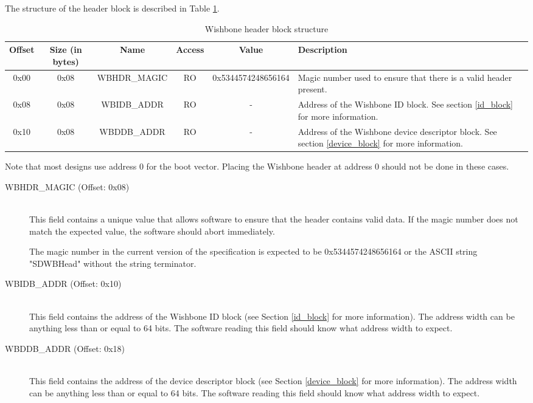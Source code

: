 \documentclass{article}
\begin{document}
The structure of the header block is described in Table \ref{hdr_block_struct}.

\begin{center}
	\begin{savenotes}
	\begin{table}[!ht]\footnotesize
	\caption{Wishbone header block structure}\label{hdr_block_struct}\centering
	\begin{tabular}{| c | c | c | c | c | p{5cm} |} \hline
	Offset & Size (in bytes) & Name & Access & Value & Description \\ \hline
	0x00 & 0x08 & WBHDR\_MAGIC & RO & 0x5344574248656164 & Magic number used to ensure that there is a valid header present. \\ \hline
	0x08 & 0x08 & WBIDB\_ADDR & RO & - & Address of the Wishbone ID block. See section \ref{id_block} for more information. \\ \hline
	0x10 & 0x08 & WBDDB\_ADDR & RO & - & Address of the Wishbone device descriptor block. See section \ref{device_block} for more information. \\ \hline
	\end{tabular}
	\end{table}
	\end{savenotes}
\end{center}

Note that most designs use address 0 for the boot vector. Placing the Wishbone
header at address 0 should not be done in these cases.

\begin{description}
\item[WBHDR\_MAGIC (Offset: 0x08)] \hfill \\
This field contains a unique value that allows software to ensure that
the header contains valid data. If the magic number does not match the
expected value, the software should abort immediately.

The magic number in the current version of the specification is expected to
be 0x5344574248656164 or the ASCII string "SDWBHead" without the string
terminator.

\item[WBIDB\_ADDR (Offset: 0x10)] \hfill \\
This field contains the address of the Wishbone ID block (see Section \ref{id_block}
for more information). The address width can be anything less than or equal
to 64 bits. The software reading this field should know what address width to
expect.

\item[WBDDB\_ADDR (Offset: 0x18)] \hfill \\
This field contains the address of the device descriptor block (see Section
\ref{device_block} for more information). The address width can be anything
less than or equal to 64 bits. The software reading this field should know
what address width to expect.
\end{description}
\end{document}
